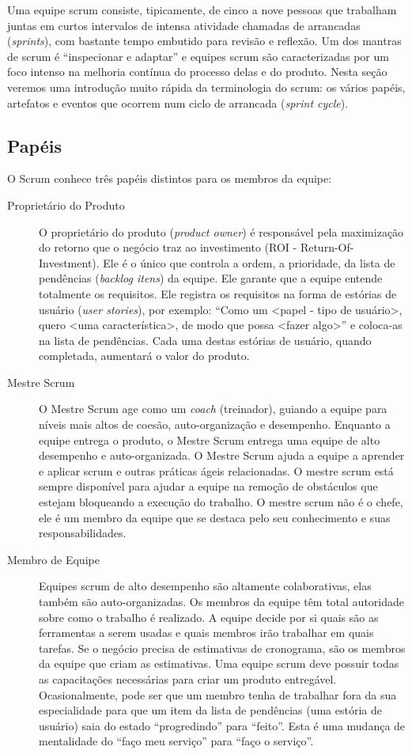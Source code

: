 \documentclass[
	11pt,				%
	openright,
	twoside,			%
	a4paper,			%
	english,			%
	french,
	brazil,				%
	sumario=tradicional
	]{abntex2}
\begin{document}
Uma equipe scrum consiste, tipicamente, de cinco a nove pessoas que trabalham juntas em curtos intervalos de intensa atividade chamadas de arrancadas (\emph{sprints}), com bastante tempo embutido para revisão e reflexão. Um dos mantras de scrum é ``inspecionar e adaptar'' e equipes scrum são caracterizadas por um foco intenso  na melhoria contínua do processo delas e do produto. Nesta seção veremos uma introdução muito rápida da terminologia do scrum: os vários papéis, artefatos e eventos que ocorrem num ciclo de arrancada (\emph{sprint cycle}).

\subsection{Papéis}
O Scrum conhece três papéis distintos para os membros da equipe:
\begin{description}
\item[Proprietário do Produto] O proprietário do produto (\emph{product owner}) é responsável pela maximização do retorno que o negócio traz ao investimento (ROI - Return-Of-Investment). Ele é o único que controla a ordem, a prioridade, da lista de pendências (\textit{backlog itens}) da equipe. Ele garante que a equipe entende totalmente os requisitos. Ele registra os requisitos na forma de estórias de usuário (\emph{user stories}), por exemplo: ``Como um <papel - tipo de usuário>, quero <uma característica>, de modo que possa <fazer algo>'' e coloca-as na lista de pendências. Cada uma destas estórias de usuário, quando completada, aumentará o valor do produto.

\item[Mestre Scrum] O Mestre Scrum age como um \textit{coach} (treinador), guiando a equipe para níveis mais altos de coesão, auto-organização e desempenho. Enquanto a equipe entrega o produto, o Mestre Scrum entrega uma equipe de alto desempenho e auto-organizada. O Mestre Scrum ajuda a equipe a aprender e aplicar scrum e outras práticas ágeis relacionadas. O mestre scrum está sempre disponível para ajudar a equipe na remoção de obstáculos que estejam bloqueando a execução do trabalho. O mestre scrum não é o chefe, ele é um membro da equipe que se destaca pelo seu conhecimento e suas responsabilidades.

\item[Membro de Equipe] Equipes scrum de alto desempenho são altamente colaborativas, elas também são auto-organizadas. Os membros da equipe têm total autoridade sobre como o trabalho é realizado. A equipe decide por si quais são as ferramentas a serem usadas e quais membros irão trabalhar em quais tarefas. Se o negócio precisa de estimativas de cronograma, são os membros da equipe que criam as estimativas. Uma equipe scrum deve possuir todas as capacitações necessárias para criar um produto entregável. Ocasionalmente, pode ser que um membro tenha de trabalhar fora da sua especialidade para que um item da lista de pendências (uma estória de usuário) saia do estado ``progredindo'' para ``feito''. Esta é uma mudança de mentalidade do ``faço meu serviço'' para ``faço o serviço''. 

\end{description}
\end{document}
